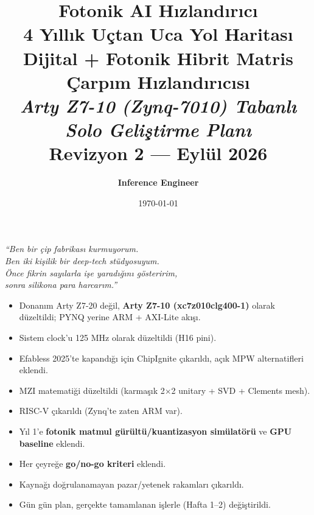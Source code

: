 \documentclass[11pt,a4paper]{article}
\title{
    \vspace{-2cm}
    \Huge\textbf{\textcolor{primary}{Fotonik AI Hızlandırıcı}}\\[0.5cm]
    \Large\textbf{\textcolor{secondary}{4 Yıllık Uçtan Uca Yol Haritası}}\\[0.3cm]
    \large Dijital + Fotonik Hibrit Matris Çarpım Hızlandırıcısı\\[0.5cm]
    \normalsize\textit{Arty Z7-10 (Zynq-7010) Tabanlı Solo Geliştirme Planı}\\[0.2cm]
    \normalsize Revizyon 2 — Eylül 2026
}
\author{\textbf{Inference Engineer}}
\date{\today}
\begin{document}
\maketitle
\thispagestyle{empty}

\vspace{1cm}

\begin{center}
\begin{tcolorbox}[colback=primary!10, colframe=primary, width=0.9\textwidth, arc=3mm]
\centering
\large\textit{``Ben bir çip fabrikası kurmuyorum.\\ Ben iki kişilik bir deep-tech stüdyosuyum.\\ Önce fikrin sayılarla işe yaradığını gösteririm,\\ sonra silikona para harcarım.''}
\end{tcolorbox}
\end{center}

\vspace{0.5cm}

\begin{notebox}
\begin{itemize}[leftmargin=*,nosep]
    \item Donanım Arty Z7-20 değil, \textbf{Arty Z7-10 (xc7z010clg400-1)} olarak düzeltildi; PYNQ yerine ARM + AXI-Lite akışı.
    \item Sistem clock'u 125 MHz olarak düzeltildi (H16 pini).
    \item Efabless 2025'te kapandığı için ChipIgnite çıkarıldı, açık MPW alternatifleri eklendi.
    \item MZI matematiği düzeltildi (karmaşık 2$\times$2 unitary + SVD + Clements mesh).
    \item RISC-V çıkarıldı (Zynq'te zaten ARM var).
    \item Yıl 1'e \textbf{fotonik matmul gürültü/kuantizasyon simülatörü} ve \textbf{GPU baseline} eklendi.
    \item Her çeyreğe \textbf{go/no-go kriteri} eklendi.
    \item Kaynağı doğrulanamayan pazar/yetenek rakamları çıkarıldı.
    \item Gün gün plan, gerçekte tamamlanan işlerle (Hafta 1--2) değiştirildi.
\end{itemize}
\end{notebox}

\tableofcontents
\newpage

\end{document}

